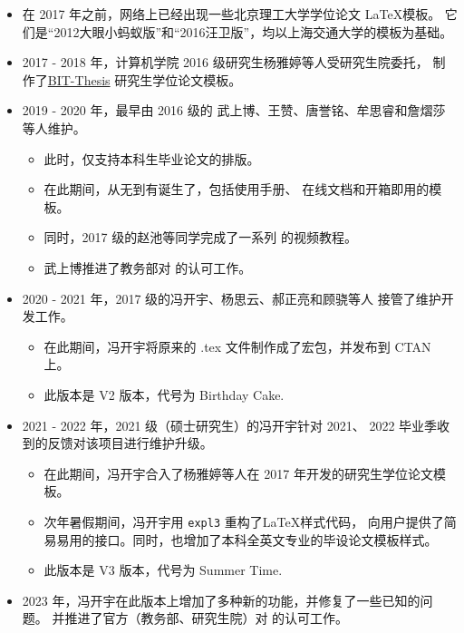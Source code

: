 \begin{appendices}
\begin{itemize}[nosep]
  \item 在 2017 年之前，网络上已经出现一些北京理工大学学位论文 \LaTeX 模板。
    它们是“2012大眼小蚂蚁版”和“2016汪卫版”，均以上海交通大学的模板为基础。
  \item 2017 - 2018 年，计算机学院 2016 级研究生杨雅婷等人受研究生院委托，
    制作了\href{https://github.com/BIT-thesis/LaTeX-template}{BIT-Thesis}
    研究生学位论文模板。
  \item 2019 - 2020 年，\BIThesis 最早由 2016 级的
    武上博、王赞、唐誉铭、牟思睿和詹熠莎等人维护。
    \begin{itemize}[nosep]
    \item 此时，\BIThesis 仅支持本科生毕业论文的排版。
    \item 在此期间，\BIThesis 从无到有诞生了，包括使用手册、
      在线文档和开箱即用的模板。
    \item 同时，2017 级的赵池等同学完成了一系列 \BIThesis
      的视频教程。
    \item 武上博推进了教务部对 \BIThesis{} 的认可工作。
  \end{itemize}
  \item 2020 - 2021 年，2017 级的冯开宇、杨思云、郝正亮和顾骁等人
      接管了维护开发工作。
  \begin{itemize}[nosep]
    \item 在此期间，冯开宇将原来的 .tex 文件制作成了宏包，并发布到 CTAN 上。
    \item 此版本是 V2 版本，代号为 Birthday Cake.
  \end{itemize}
  \item 2021 - 2022 年，2021 级（硕士研究生）的冯开宇针对 2021、
      2022 毕业季收到的反馈对该项目进行维护升级。
  \begin{itemize}[nosep]
    \item 在此期间，冯开宇合入了杨雅婷等人在 2017 年开发的研究生学位论文模板。
    \item 次年暑假期间，冯开宇用 \verb|expl3| 重构了\LaTeX 样式代码，
      向用户提供了简易易用的接口。同时，也增加了本科全英文专业的毕设论文模板样式。
    \item 此版本是 V3 版本，代号为 Summer Time.
  \end{itemize}
  \item 2023 年，冯开宇在此版本上增加了多种新的功能，并修复了一些已知的问题。
  并推进了官方（教务部、研究生院）对 \BIThesis 的认可工作。
\end{itemize}

\end{appendices}
